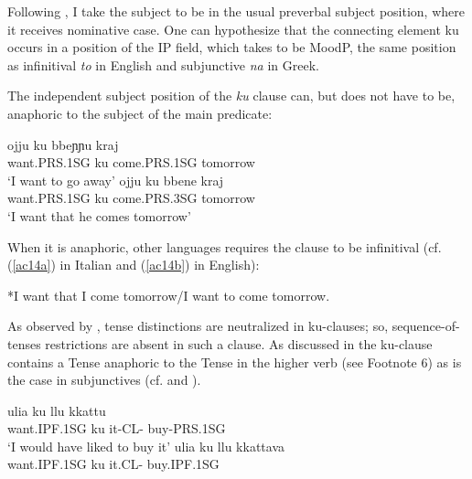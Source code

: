 \documentclass[output=paper]{langscibook}
\begin{document}
Following \cite[p36]{calabrese1993a}, I take the subject to be in the usual preverbal subject position, where it receives nominative case.  One can hypothesize that the connecting element ku occurs in a position of the IP field, which \cite{roberts2003a} takes to be MoodP, the same position as infinitival \textit{to} in English and subjunctive \textit{na} in Greek.

The independent subject position of the \textit{ku} clause can, but does not have to be, anaphoric to the subject of the main predicate:

\ea \label{ac13}
    \ea \label{ac13a}
        \gll ojju          ku   bbeɲɲu      kraj\\
   want.PRS.1SG   ku    come.PRS.1SG  tomorrow\\
    \glt   ‘I want to go away’
    \ex \label{ac13b}
        \gll ojju          ku   bbene       kraj \\
   want.PRS.1SG   ku   come.PRS.3SG  tomorrow\\
    \glt ‘I want that he comes tomorrow’
    \z
\z

When it is anaphoric, other languages requires the clause to be infinitival (cf. (\ref{ac14a}) in Italian and (\ref{ac14b}) in English):

\ea \label{ac14}
    \ex \label{ac14b}*I want that I come tomorrow/I want to come tomorrow.
    \z
\z

 As observed by \cite{calabrese1993a}, tense distinctions are neutralized in ku-clauses; so, sequence-of-tenses restrictions are absent in such a clause.  As discussed in \cite{calabrese1993a} the ku-clause contains a Tense anaphoric to the Tense in the higher verb (see Footnote 6) as is the case in subjunctives (cf. \cite[p46-48]{calabrese1993a} and \cite[p652]{manzini2005a}).

\ea \label{ac15}
    \ea \label{ac15a}\gll ulia        ku   llu    kkattu \\
     want.IPF.1SG ku   it-CL-  buy-PRS.1SG\\
    \glt ‘I would have liked to buy it’
    \ex \label{ac15b}\gll *ulia       ku   llu     kkattava \\
     want.IPF.1SG ku   it.CL-  buy.IPF.1SG \\
    \z
\z
     
\end{document}
